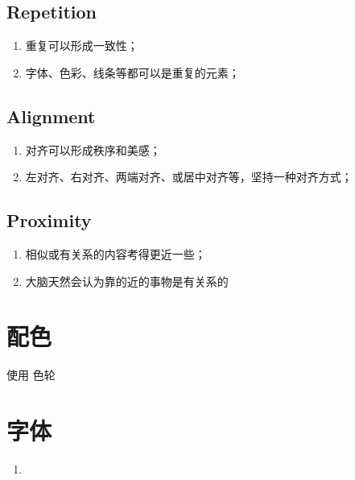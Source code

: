 \documentclass[letterpaper,10pt,english]{sphinxmanual}
\begin{document}
\subsection{Repetition}
\label{\detokenize{formatting/layout-design:repetition}}\begin{enumerate}
%
\item {} 
\sphinxAtStartPar
重复可以形成一致性；

\item {} 
\sphinxAtStartPar
字体、色彩、线条等都可以是重复的元素；

\end{enumerate}


\subsection{Alignment}
\label{\detokenize{formatting/layout-design:alignment}}\begin{enumerate}
%
\item {} 
\sphinxAtStartPar
对齐可以形成秩序和美感；

\item {} 
\sphinxAtStartPar
左对齐、右对齐、两端对齐、或居中对齐等，坚持一种对齐方式；

\end{enumerate}


\subsection{Proximity}
\label{\detokenize{formatting/layout-design:proximity}}\begin{enumerate}
%
\item {} 
\sphinxAtStartPar
相似或有关系的内容考得更近一些；

\item {} 
\sphinxAtStartPar
大脑天然会认为靠的近的事物是有关系的

\end{enumerate}


\section{配色}
\label{\detokenize{formatting/layout-design:id2}}
\sphinxAtStartPar
使用  色轮


\section{字体}
\label{\detokenize{formatting/layout-design:id3}}\begin{enumerate}
%
\item {} 
\sphinxAtStartPar
{}

\end{enumerate}
\end{document}
